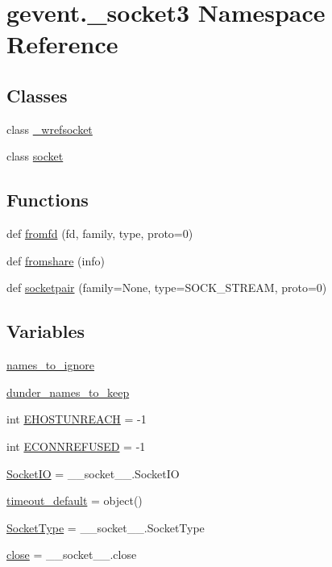 \hypertarget{namespacegevent_1_1__socket3}{}\section{gevent.\+\_\+socket3 Namespace Reference}
\label{namespacegevent_1_1__socket3}
\subsection*{Classes}
\begin{DoxyCompactItemize}
\item 
class \hyperlink{classgevent_1_1__socket3_1_1__wrefsocket}{\+\_\+wrefsocket}
\item 
class \hyperlink{classgevent_1_1__socket3_1_1socket}{socket}
\end{DoxyCompactItemize}
\subsection*{Functions}
\begin{DoxyCompactItemize}
\item 
def \hyperlink{namespacegevent_1_1__socket3_afee07c7980d68bbd43fe9fa22e7bc543}{fromfd} (fd, family, type, proto=0)
\item 
def \hyperlink{namespacegevent_1_1__socket3_a5f5c2b678f70a7a54b1ae17e90572992}{fromshare} (info)
\item 
def \hyperlink{namespacegevent_1_1__socket3_ac4533378cc02af62ff3518867e7b5efd}{socketpair} (family=None, type=S\+O\+C\+K\+\_\+\+S\+T\+R\+E\+AM, proto=0)
\end{DoxyCompactItemize}
\subsection*{Variables}
\begin{DoxyCompactItemize}
\item 
\hyperlink{namespacegevent_1_1__socket3_a346ac852fc35904cfcd1404629344c79}{names\+\_\+to\+\_\+ignore}
\item 
\hyperlink{namespacegevent_1_1__socket3_a6b4d9ca5ec84530d82ded6d7c1a0f625}{dunder\+\_\+names\+\_\+to\+\_\+keep}
\item 
int \hyperlink{namespacegevent_1_1__socket3_ab1860b5f800d108bbd2dfd628a6ddbb4}{E\+H\+O\+S\+T\+U\+N\+R\+E\+A\+CH} = -\/1
\item 
int \hyperlink{namespacegevent_1_1__socket3_a3b86d8ad9f340864357d63d241d372eb}{E\+C\+O\+N\+N\+R\+E\+F\+U\+S\+ED} = -\/1
\item 
\hyperlink{namespacegevent_1_1__socket3_a2a62116b59be85ef70fa350dd6250e5e}{Socket\+IO} = \+\_\+\+\_\+socket\+\_\+\+\_\+.\+Socket\+IO
\item 
\hyperlink{namespacegevent_1_1__socket3_a4e43e22861afa146e11b8964d5772684}{timeout\+\_\+default} = object()
\item 
\hyperlink{namespacegevent_1_1__socket3_a6267687dbe403a376a86bb4d4de248db}{Socket\+Type} = \+\_\+\+\_\+socket\+\_\+\+\_\+.\+Socket\+Type
\item 
\hyperlink{namespacegevent_1_1__socket3_ac3701a95ca7cd9fe3f54cfa93e942647}{close} = \+\_\+\+\_\+socket\+\_\+\+\_\+.\+close
\end{DoxyCompactItemize}


